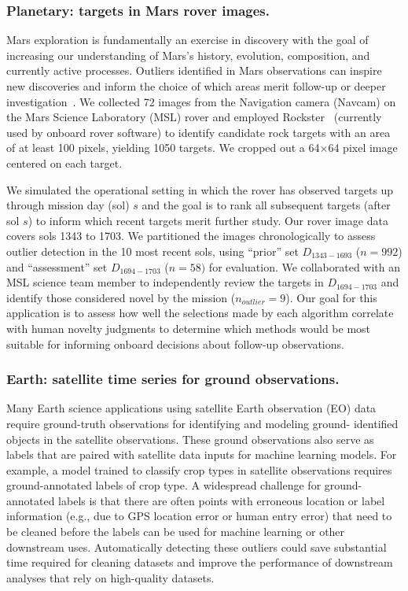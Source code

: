 \documentclass[letterpaper]{article} %
\begin{document}
\subsubsection{Planetary: targets in Mars rover images.}
Mars exploration is fundamentally an exercise in discovery with the
goal of increasing our understanding of Mars's history, evolution,
composition, and currently active processes.  Outliers
identified in Mars observations can inspire new discoveries and inform
the choice of which areas merit follow-up or deeper
investigation~\cite{kerner2020comparison,wagstaff:rover-novelty20}.
We collected \num{72} images from the Navigation camera (Navcam) 
on the Mars Science Laboratory (MSL) rover
and employed Rockster~\cite{burl:rockster16}
(currently used by onboard rover software) to identify candidate rock
targets with an area of at least 100 pixels, yielding \num{1050}
targets.  We cropped out a \num{64}$\times$\num{64} pixel image
centered on each target.

We simulated the operational setting in which the rover has observed
targets up through mission day (sol) $s$ and the goal is to rank all
subsequent targets (after sol $s$) to inform which recent targets
merit further study.  Our rover image data covers sols \num{1343}
to \num{1703}.  We partitioned the images chronologically to assess
outlier detection in the 10 most recent sols, using ``prior'' set
$D_{1343-1693}$ ($n=992$) and ``assessment'' set $D_{1694-1703}$
($n=58)$ for evaluation. We collaborated with an MSL science team member to
independently review the targets in $D_{1694-1703}$ and identify those
considered novel by the mission ($n_{outlier} = 9$).  Our goal for
this application is to assess how well the selections made by each
algorithm correlate with human novelty judgments to determine which
methods would be most suitable for informing onboard decisions about
follow-up observations.

\subsubsection{Earth: satellite time series for ground observations.}
Many Earth science applications using satellite Earth observation (EO) data
 require ground-truth observations for identifying and modeling ground-
 identified objects in the satellite observations. These ground observations
 also serve as labels that are paired with satellite data inputs for machine 
 learning models. For example, a model trained to classify crop types in
 satellite observations requires ground-annotated labels of crop type. A widespread challenge for ground-
 annotated labels is that there are often points with erroneous location or 
 label information (e.g., due to GPS location error or human entry error) that
 need to be cleaned before the labels can be used for machine learning or
 other downstream uses. Automatically detecting these outliers could save 
 substantial time required for cleaning datasets and improve the performance of
 downstream analyses that rely on high-quality datasets. 
 
\end{document}
